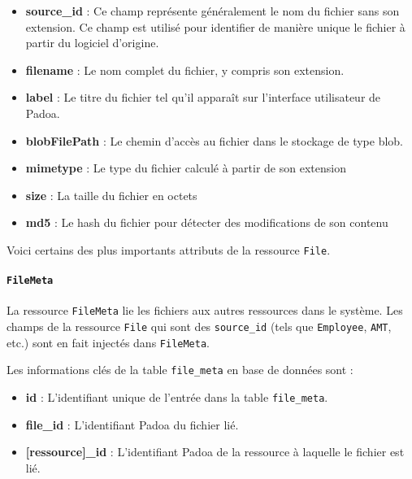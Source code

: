 \begin{itemize}
    \item \textbf{source\_id} : Ce champ représente généralement le nom du fichier sans son extension. Ce champ est utilisé pour identifier de manière unique le fichier à partir du logiciel d'origine.
    \item \textbf{filename} : Le nom complet du fichier, y compris son extension.
    \item \textbf{label} : Le titre du fichier tel qu'il apparaît sur l'interface utilisateur de Padoa.
    \item \textbf{blobFilePath} : Le chemin d'accès au fichier dans le stockage de type blob.
    \item \textbf{mimetype} : Le type du fichier calculé à partir de son extension
    \item \textbf{size} : La taille du fichier en octets
    \item \textbf{md5} : Le hash du fichier pour détecter des modifications de son contenu
\end{itemize}
Voici certains des plus importants attributs de la ressource \texttt{File}. 

\paragraph{\texttt{FileMeta}}

La ressource \texttt{FileMeta} lie les fichiers aux autres ressources dans le système. Les champs de la ressource \texttt{File} qui sont des \texttt{source\_id} (tels que \texttt{Employee}, \texttt{AMT}, etc.) sont en fait injectés dans \texttt{FileMeta}.

Les informations clés de la table \texttt{file\_meta} en base de données sont :

\begin{itemize}
    \item \textbf{id} : L'identifiant unique de l'entrée dans la table \texttt{file\_meta}.
    \item \textbf{file\_id} : L'identifiant Padoa du fichier lié.
    \item \textbf{[ressource]\_id} : L'identifiant Padoa de la ressource à laquelle le fichier est lié.
\end{itemize}
